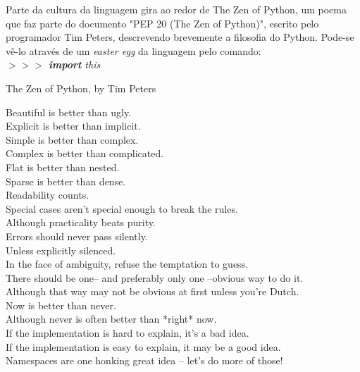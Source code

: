 Parte da cultura da linguagem gira ao redor de The Zen of Python, um poema que faz parte do documento "PEP 20 (The Zen of Python)", escrito pelo programador Tim Peters, descrevendo brevemente a filosofia do Python.
Pode-se vê-lo através de um \textit{easter egg} da linguagem pelo comando:
\\\textit{$>>>$ \textbf{import} this}
\begin{citacao}
    The Zen of Python, by Tim Peters

Beautiful is better than ugly.\\
Explicit is better than implicit.\\
Simple is better than complex.\\
Complex is better than complicated.\\
Flat is better than nested.\\
Sparse is better than dense.\\
Readability counts.\\
Special cases aren't special enough to break the rules.\\
Although practicality beats purity.\\
Errors should never pass silently.\\
Unless explicitly silenced.\\
In the face of ambiguity, refuse the temptation to guess.\\
There should be one-- and preferably only one --obvious way to do it.\\
Although that way may not be obvious at first unless you're Dutch.\\
Now is better than never.\\
Although never is often better than *right* now.\\
If the implementation is hard to explain, it's a bad idea.\\
If the implementation is easy to explain, it may be a good idea.\\
Namespaces are one honking great idea -- let's do more of those!\\

\end{citacao}